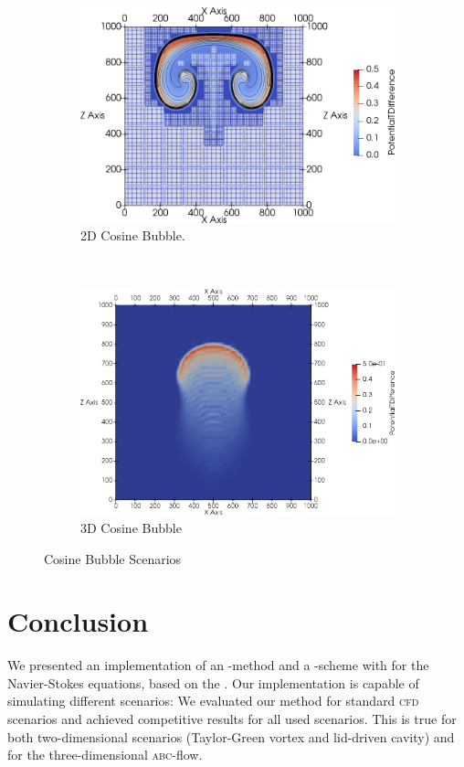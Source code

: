 \documentclass[runningheads]{llncs}
\begin{document}
\begin{figure}[tb]
  \centering
  \begin{subfigure}[t]{0.5\textwidth}
    \centering
    \includegraphics[width=\textwidth]{paper_cosine_bubble}
    \caption{\label{fig:cosine-2d}2D Cosine Bubble.}%
  \end{subfigure}~%
  \begin{subfigure}[t]{0.5\textwidth}
    \centering
    \includegraphics[width=\textwidth]{paper_cosine_bubble_3d}
    \caption{3D Cosine Bubble}
  \end{subfigure}
  \caption{\label{fig:cosine-3d}Cosine Bubble Scenarios}
  \label{fig:cosine-bubbles-results}
\end{figure}


\section{Conclusion}
We presented an implementation of an \aderdg{}-method and a \muscl{}-scheme with \amr{} for the Navier-Stokes equations, based on the \exahypeengine.
Our implementation is capable of simulating different scenarios:
We evaluated our method for standard \textsc{cfd} scenarios and achieved competitive results for all used scenarios.
This is true for both two-dimensional scenarios (Taylor-Green vortex and lid-driven cavity) and for the three-dimensional \textsc{abc}-flow.
\end{document}
